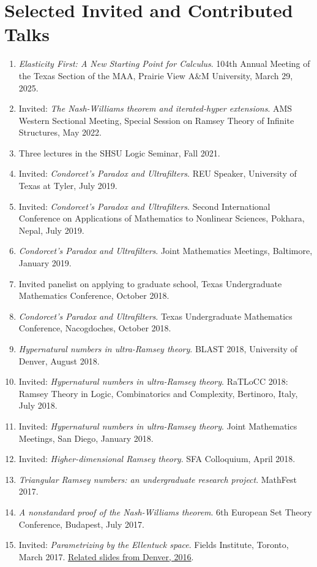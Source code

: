 \documentclass[10pt,letterpaper]{article}
\begin{document}
\section*{Selected Invited and Contributed Talks}
\begin{enumerate}
\item \emph{Elasticity First: A New Starting Point for Calculus}. 104th Annual Meeting of the Texas Section of the MAA, Prairie View A\&M University, March 29, 2025.
\item Invited: \emph{The Nash-Williams theorem and iterated-hyper extensions}. AMS Western Sectional Meeting, Special Session on Ramsey Theory of Infinite Structures, May 2022.
\item Three lectures in the SHSU Logic Seminar, Fall 2021.
\item Invited: \emph{Condorcet's Paradox and Ultrafilters}. REU Speaker, University of Texas at Tyler, July 2019.
\item Invited: \emph{Condorcet's Paradox and Ultrafilters}. Second International Conference on Applications of Mathematics to Nonlinear Sciences, Pokhara, Nepal, July 2019.
\item \emph{Condorcet's Paradox and Ultrafilters}. Joint Mathematics Meetings, Baltimore, January 2019.
\item Invited panelist on applying to graduate school, Texas Undergraduate Mathematics Conference, October 2018.
\item \emph{Condorcet's Paradox and Ultrafilters}. Texas Undergraduate Mathematics Conference, Nacogdoches, October 2018.
\item \emph{Hypernatural numbers in ultra-Ramsey theory}. BLAST 2018, University of Denver, August 2018.
\item Invited: \emph{Hypernatural numbers in ultra-Ramsey theory}. RaTLoCC 2018: Ramsey Theory in Logic, Combinatorics and Complexity, Bertinoro, Italy, July 2018.
\item Invited: \emph{Hypernatural numbers in ultra-Ramsey theory}. Joint Mathematics Meetings, San Diego, January 2018.
\item Invited: \emph{Higher-dimensional Ramsey theory}. SFA Colloquium, April 2018.
\item \emph{Triangular Ramsey numbers: an undergraduate research project}. MathFest 2017.
\item \emph{A nonstandard proof of the Nash-Williams theorem}. 6th European Set Theory Conference, Budapest, July 2017.
\item Invited: \emph{Parametrizing by the Ellentuck space}. Fields Institute, Toronto, March 2017. \href{https://trujillo1234.github.io/research/presentations/ams-western-ellentuck.pdf}{Related slides from Denver, 2016}.

\end{enumerate}
\end{document}
